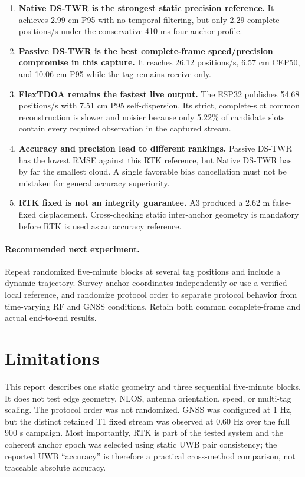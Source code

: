 \documentclass[11pt,a4paper]{article}
\begin{document}
\begin{enumerate}[leftmargin=7mm]
  \item \textbf{Native DS-TWR is the strongest static precision reference.}
  It achieves 2.99 cm P95 with no temporal filtering, but only 2.29 complete
  positions/s under the conservative 410 ms four-anchor profile.

  \item \textbf{Passive DS-TWR is the best complete-frame speed/precision
  compromise in this capture.} It reaches 26.12 positions/s, 6.57 cm CEP50,
  and 10.06 cm P95 while the tag remains receive-only.

  \item \textbf{FlexTDOA remains the fastest live output.} The ESP32 publishes
  54.68 positions/s with 7.51 cm P95 self-dispersion. Its strict, complete-slot
  common reconstruction is slower and noisier because only 5.22\% of candidate
  slots contain every required observation in the captured stream.

  \item \textbf{Accuracy and precision lead to different rankings.} Passive
  DS-TWR has the lowest RMSE against this RTK reference, but Native DS-TWR has
  by far the smallest cloud. A single favorable bias cancellation must not be
  mistaken for general accuracy superiority.

  \item \textbf{RTK fixed is not an integrity guarantee.} A3 produced a
  2.62 m false-fixed displacement. Cross-checking static inter-anchor geometry
  is mandatory before RTK is used as an accuracy reference.
\end{enumerate}

\paragraph{Recommended next experiment.}
Repeat randomized five-minute blocks at several tag positions and include a
dynamic trajectory. Survey anchor coordinates independently or use a verified
local reference, and randomize protocol order to separate protocol behavior
from time-varying RF and GNSS conditions. Retain both common complete-frame and
actual end-to-end results.

\section{Limitations}

This report describes one static geometry and three sequential five-minute
blocks. It does not test edge geometry, NLOS, antenna orientation, speed, or
multi-tag scaling. The protocol order was not randomized. GNSS was configured
at 1 Hz, but the distinct retained T1 fixed stream was observed at 0.60 Hz over
the full 900 s campaign. Most importantly, RTK is part of the tested system and
the coherent anchor epoch was selected using static UWB pair consistency; the
reported UWB ``accuracy'' is therefore a practical cross-method comparison,
not traceable absolute accuracy.
\end{document}

